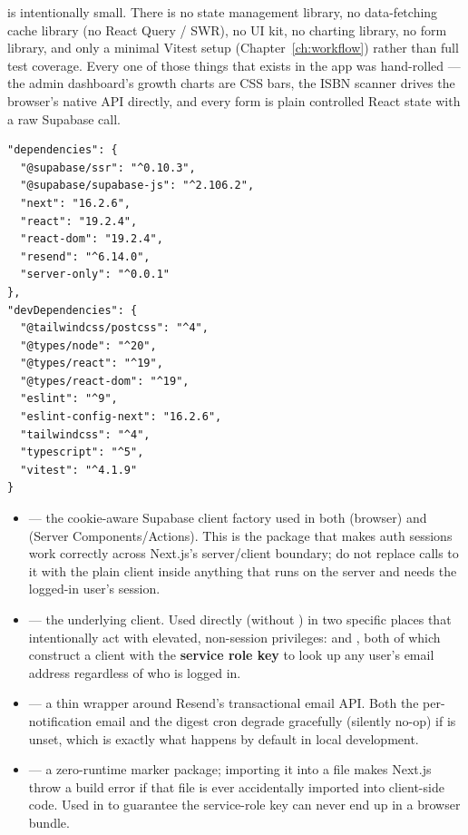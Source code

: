  is intentionally small. There is no state management library, no data-fetching cache library (no React Query / SWR), no UI kit, no charting library, no form library, and only a minimal Vitest setup (Chapter~\ref{ch:workflow}) rather than full test coverage. Every one of those things that exists in the app was hand-rolled — the admin dashboard's growth charts are CSS bars, the ISBN scanner drives the browser's native  API directly, and every form is plain controlled React state with a raw Supabase call.

\begin{lstlisting}[caption={\pathname{package.json} — dependencies}]
"dependencies": {
  "@supabase/ssr": "^0.10.3",
  "@supabase/supabase-js": "^2.106.2",
  "next": "16.2.6",
  "react": "19.2.4",
  "react-dom": "19.2.4",
  "resend": "^6.14.0",
  "server-only": "^0.0.1"
},
"devDependencies": {
  "@tailwindcss/postcss": "^4",
  "@types/node": "^20",
  "@types/react": "^19",
  "@types/react-dom": "^19",
  "eslint": "^9",
  "eslint-config-next": "16.2.6",
  "tailwindcss": "^4",
  "typescript": "^5",
  "vitest": "^4.1.9"
}
\end{lstlisting}

\begin{itemize}
  \item \textbf{} — the cookie-aware Supabase client factory used in both  (browser) and  (Server Components/Actions). This is the package that makes auth sessions work correctly across Next.js's server/client boundary; do not replace calls to it with the plain  client inside anything that runs on the server and needs the logged-in user's session.
  \item \textbf{} — the underlying client. Used directly (without ) in two specific places that intentionally act with elevated, non-session privileges:  and , both of which construct a client with the \textbf{service role key} to look up any user's email address regardless of who is logged in.
  \item \textbf{} — a thin wrapper around Resend's transactional email API. Both the per-notification email and the digest cron degrade gracefully (silently no-op) if  is unset, which is exactly what happens by default in local development.
  \item \textbf{} — a zero-runtime marker package; importing it into a file makes Next.js throw a build error if that file is ever accidentally imported into client-side code. Used in  to guarantee the service-role key can never end up in a browser bundle.
\end{itemize}

